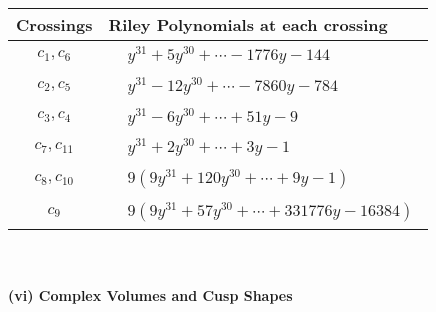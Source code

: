\documentclass[1p]{elsarticle_modified}
\theoremstyle{definition}
\begin{document}
\begin{tabular}{m{50pt}|m{274pt}}
Crossings & \hspace{64pt}Riley Polynomials at each crossing \\
\hline $$\begin{aligned}c_{1},c_{6}\end{aligned}$$&$\begin{aligned}
&y^{31}+5 y^{30}+\cdots-1776 y-144
\end{aligned}$\\
\hline $$\begin{aligned}c_{2},c_{5}\end{aligned}$$&$\begin{aligned}
&y^{31}-12 y^{30}+\cdots-7860 y-784
\end{aligned}$\\
\hline $$\begin{aligned}c_{3},c_{4}\end{aligned}$$&$\begin{aligned}
&y^{31}-6 y^{30}+\cdots+51 y-9
\end{aligned}$\\
\hline $$\begin{aligned}c_{7},c_{11}\end{aligned}$$&$\begin{aligned}
&y^{31}+2 y^{30}+\cdots+3 y-1
\end{aligned}$\\
\hline $$\begin{aligned}c_{8},c_{10}\end{aligned}$$&$\begin{aligned}
&9(9 y^{31}+120 y^{30}+\cdots+9 y-1)
\end{aligned}$\\
\hline $$\begin{aligned}c_{9}\end{aligned}$$&$\begin{aligned}
&9(9 y^{31}+57 y^{30}+\cdots+331776 y-16384)
\end{aligned}$\\
\hline
\end{tabular}\\~\\
\newpage\flushleft \textbf{(vi) Complex Volumes and Cusp Shapes}
\end{document}
